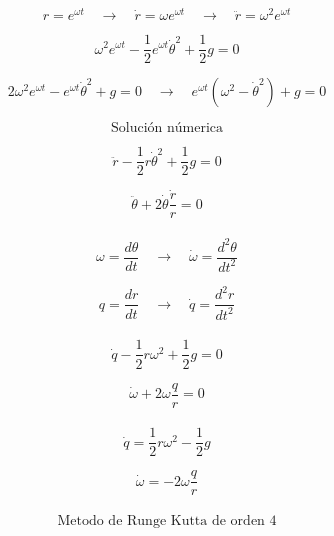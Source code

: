 \documentclass[10pt,a4papper]{article}
\begin{document}
\[r=e^{\omega t}\quad\to\quad
\dot r=\omega e^{\omega t}\quad\to\quad
\ddot r=\omega^2 e^{\omega t}\]

\[\omega^2 e^{\omega t}-\frac{1}{2}e^{\omega t}\dot\theta^2+\frac{1}{2}g=0\]

\[2\omega^2 e^{\omega t}-e^{\omega t}\dot\theta^2+g=0\quad\to\quad
e^{\omega t}(\omega^2-\dot\theta^2)+g=0\]


\newpage
\[\text{Solución númerica}\]

\[\ddot r-\frac{1}{2}r\dot\theta^2+\frac{1}{2}g=0\]

\[\ddot\theta+2\dot\theta\frac{\dot r}{r}=0\]\\

\[\omega=\frac{d\theta}{dt}\quad\to\quad\dot\omega=\frac{d^2\theta}{dt^2}\]

\[q=\frac{dr}{dt}\quad\to\quad\dot q=\frac{d^2r}{dt^2}\]\\

\[\dot q-\frac{1}{2}r\omega^2+\frac{1}{2}g=0\]

\[\dot\omega+2\omega\frac{q}{r}=0\]\\

\[\dot q=\frac{1}{2}r\omega^2-\frac{1}{2}g\]

\[\dot\omega=-2\omega\frac{q}{r}\]\\

\newpage
\[\text{Metodo de Runge Kutta de orden 4}\]
\end{document}
